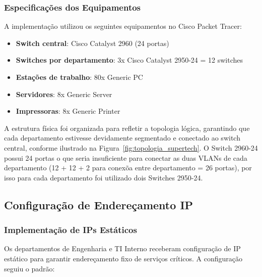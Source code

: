 \subsubsection{Especificações dos Equipamentos}

A implementação utilizou os seguintes equipamentos no Cisco Packet Tracer:

\begin{itemize}
    \item \textbf{Switch central}: Cisco Catalyst 2960 (24 portas)
    \item \textbf{Switches por departamento}: 3x Cisco Catalyst 2950-24 = 12 switches
    \item \textbf{Estações de trabalho}: 80x Generic PC
    \item \textbf{Servidores}: 8x Generic Server
    \item \textbf{Impressoras}: 8x Generic Printer
\end{itemize}

\par A estrutura física foi organizada para refletir a topologia lógica, garantindo que cada departamento estivesse devidamente segmentado e conectado ao switch central, conforme ilustrado na Figura~\ref{fig:topologia_supertech}. O Switch 2960-24 possui 24 portas o que seria insuficiente para conectar as duas VLANs de cada departamento (12 + 12 + 2 para conexõa entre departamento = 26 portas), por isso para cada departamento foi utilizado dois Switches 2950-24.

\subsection{Configuração de Endereçamento IP}

\subsubsection{Implementação de IPs Estáticos}

Os departamentos de Engenharia e TI Interno receberam configuração de IP estático para garantir endereçamento fixo de serviços críticos. A configuração seguiu o padrão:


